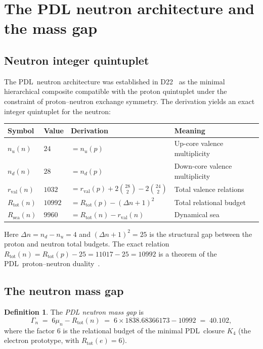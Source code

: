 \documentclass[11pt,a4paper]{article}
\theoremstyle{definition}
\newtheorem{definition}[theorem]{Definition}
\newcommand{\PDL}{\textnormal{PDL}}
\newcommand{\Rsea}{R_{\mathrm{sea}}}
\newcommand{\Rtot}{R_{\mathrm{tot}}}
\newcommand{\rval}{r_{\mathrm{val}}}
\newcommand{\Kfour}{K_4}
\begin{document}
\section{The PDL neutron architecture and the mass gap}
\label{sec:neutron}

\subsection{Neutron integer quintuplet}
\label{subsec:neutron_quintuplet}

The \PDL\ neutron architecture was established in D22~\cite{Nuclear_Stability_PDL_2026} as the minimal hierarchical composite compatible with the proton quintuplet under the constraint of proton--neutron exchange symmetry. The derivation yields an exact integer quintuplet for the neutron:

\begin{center}
\begin{tabular}{llll}
\toprule
Symbol & Value & Derivation & Meaning \\
\midrule
$n_u(n)$ & $24$ & $= n_u(p)$ & Up-core valence multiplicity \\
$n_d(n)$ & $28$ & $= n_d(p)$ & Down-core valence multiplicity \\
$\rval(n)$ & $1032$ & $= \rval(p) + 2\binom{28}{2} - 2\binom{24}{2}$ & Total valence relations \\
$\Rtot(n)$ & $10992$ & $= \Rtot(p) - (\Delta n + 1)^2$ & Total relational budget \\
$\Rsea(n)$ & $9960$ & $= \Rtot(n) - \rval(n)$ & Dynamical sea \\
\bottomrule
\end{tabular}
\end{center}

Here $\Delta n = n_d - n_u = 4$ and $(\Delta n + 1)^2 = 25$ is the structural gap between the proton and neutron total budgets. The exact relation $\Rtot(n) = \Rtot(p) - 25 = 11017 - 25 = 10992$ is a theorem of the \PDL\ proton--neutron duality~\cite{Nuclear_Stability_PDL_2026}.

\subsection{The neutron mass gap}
\label{subsec:mass_gap}

\begin{definition}
\label{def:mass_gap}
The \emph{PDL neutron mass gap} is
\begin{equation}
\label{eq:mass_gap}
\Gamma_n \;=\; 6\mu_n - \Rtot(n) \;=\; 6 \times 1838.68366173 - 10992 \;=\; 40.102,
\end{equation}
where the factor 6 is the relational budget of the minimal \PDL\ closure $\Kfour$ (the electron prototype, with $\Rtot(e) = 6$).
\end{definition}
\end{document}
